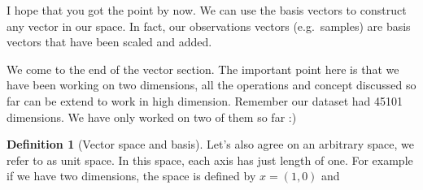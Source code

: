 \documentclass[
]{book}
\theoremstyle{definition}
\newtheorem{definition}{Definition}[chapter]
\theoremstyle{definition}
\theoremstyle{definition}
\theoremstyle{remark}
\begin{document}
I hope that you got the point by now. We can use the basis vectors to construct any vector in our space. In fact, our observations vectors (e.g.~samples) are basis vectors that have been scaled and added.

We come to the end of the vector section. The important point here is that we have been working on two dimensions, all the operations and concept discussed so far can be extend to work in high dimension. Remember our dataset had 45101 dimensions. We have only worked on two of them so far :)

\begin{definition}[Vector space and basis]
\protect\hypertarget{def:uspace}{}{\label{def:uspace} \iffalse (Vector space and basis) \fi{} }Let's also agree on an arbitrary space, we refer to as unit space. In this space, each axis has just length of one. For example if we have two dimensions, the space is defined by \(x=(1,0)\) and
\end{definition}
\end{document}
